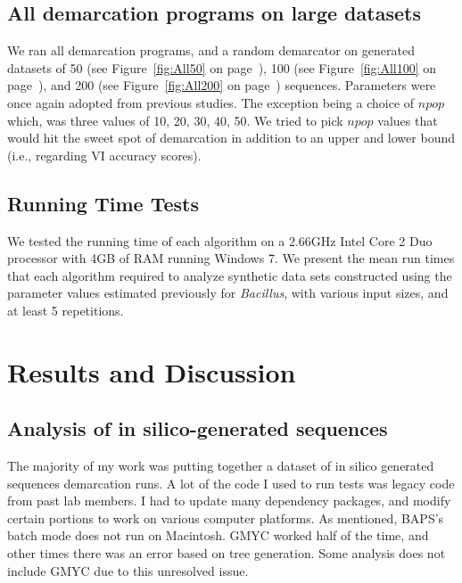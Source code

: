 \subsection*{All demarcation programs on large datasets}
We ran all demarcation programs, and a random demarcator on generated datasets of 50 (see Figure~\ref{fig:All50} on page~\pageref{fig:All50}), 100 (see Figure~\ref{fig:All100} on page~\pageref{fig:All100}), and 200 (see Figure~\ref{fig:All200} on page~\pageref{fig:All200}) sequences.
Parameters were once again adopted from previous studies.
The exception being a choice of $npop$ which, was three values of 10, 20, 30, 40, 50.
We tried to pick $npop$ values that would hit the sweet spot of demarcation in addition to an upper and lower bound (i.e., regarding VI accuracy scores).

\subsection*{Running Time Tests}
We tested the running time of each algorithm on a 2.66GHz Intel Core 2 Duo processor with 4GB of RAM running Windows 7.
We present the mean run times that each algorithm required to analyze synthetic data sets constructed using the parameter values estimated previously for \emph{Bacillus}, with various input sizes, and at least 5 repetitions.

\section{Results and Discussion}


\subsection*{Analysis of in silico-generated sequences}
The majority of my work was putting together a dataset of in silico generated sequences demarcation runs.
A lot of the code I used to run tests was legacy code from past lab members.
I had to update many dependency packages, and modify certain portions to work on various computer platforms.
As mentioned, BAPS's batch mode does not run on Macintosh.
GMYC worked half of the time, and other times there was an error based on tree generation.
Some analysis does not include GMYC due to this unresolved issue.

